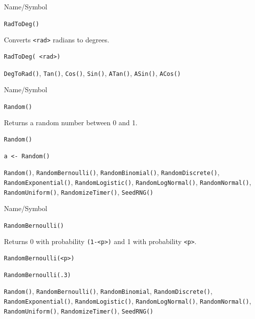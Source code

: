 \vfill
\newpage
{}
\vfill


\begin{desc}{Name/Symbol}
\item[Name/Symbol] 	\verb+RadToDeg()+ 

\item[Description] 	Converts \verb+<rad>+ radians to degrees.

\item[Usage]		
\begin{verbatim}
RadToDeg( <rad>)			 
\end{verbatim}

\item[Example]	

\item[See Also]     	\verb+DegToRad()+, \verb+Tan()+, \verb+Cos()+, \verb+Sin()+, \verb+ATan()+, \verb+ASin()+, \verb+ACos()+
\end{desc}


\begin{desc}{Name/Symbol}
\item[Name/Symbol]	\verb+Random()+

\item[Description]	Returns a random number between 0 and 1.

\item[Usage]
\begin{verbatim}
Random()
\end{verbatim}

\item[Example]
\begin{verbatim}
a <- Random()
\end{verbatim}

\item[See Also]		\verb+Random()+, \verb+RandomBernoulli()+, \verb+RandomBinomial()+, \verb+RandomDiscrete()+, \verb+RandomExponential()+, \verb+RandomLogistic()+, \verb+RandomLogNormal()+, \verb+RandomNormal()+, \verb+RandomUniform()+, \verb+RandomizeTimer()+, \verb+SeedRNG()+
\end{desc}

\begin{desc}{Name/Symbol}
\item[Name/Symbol]	\verb+RandomBernoulli()+

\item[Description]	Returns 0 with probability \verb+(1-<p>)+ and 1 with probability \verb+<p>+.

\item[Usage]		
\begin{verbatim}
RandomBernoulli(<p>)
\end{verbatim}

\item[Example]	
\begin{verbatim}
RandomBernoulli(.3)
\end{verbatim}

\item[See Also] \verb+Random()+, \verb+RandomBernoulli()+,
  \verb+RandomBinomial+, \verb+RandomDiscrete()+,
  \verb+RandomExponential()+, \verb+RandomLogistic()+,
  \verb+RandomLogNormal()+, \verb+RandomNormal()+,
  \verb+RandomUniform()+, \verb+RandomizeTimer()+, \verb+SeedRNG()+
\end{desc}


